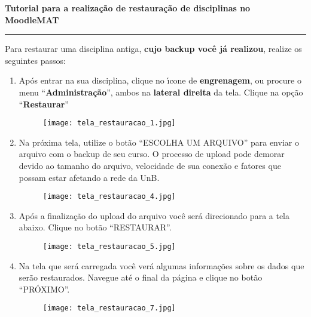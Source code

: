 \documentclass[12pt]{report}
\begin{document}
\newpage
\begin{center}
{\Large \textbf{Tutorial para a realiza\c{c}\~ao de restauração de disciplinas no MoodleMAT}}
\end{center}

\vspace{.3cm}

\hrule

\vspace{.7cm}
Para restaurar uma disciplina antiga, \textbf{cujo backup voc\^e j\'a realizou}, realize os seguintes passos:

\begin{enumerate}[\bf 1)]
	\item Ap\'os entrar na sua disciplina, clique no {\'\i}cone de \textbf{engrenagem}, ou procure o menu ``\textbf{Administra\c{c}\~ao}'', ambos na \textbf{lateral direita} da tela. Clique na opção ``\textbf{Restaurar}''
	\begin{figure}[H]
    	\centering
    	\hspace*{-2.5cm}\texttt{[image: tela\_restauracao\_1.jpg]}
  	\end{figure}

  	\newpage

	\item Na pr\'oxima tela, utilize o bot\~ao ``ESCOLHA UM ARQUIVO'' para enviar o arquivo com o backup de seu curso. O processo de upload pode demorar devido ao tamanho do arquivo, velocidade de sua conex\~ao e fatores que possam estar afetando a rede da UnB.
	\begin{figure}[H]
    	\centering
    	\hspace*{-2.5cm}\texttt{[image: tela\_restauracao\_4.jpg]}
  	\end{figure}

  	\newpage

	\item Ap\'os a finaliza\c{c}\~ao do upload do arquivo voc\^e ser\'a direcionado para a tela abaixo. Clique no bot\~ao ``RESTAURAR''.
	\begin{figure}[H]
    	\centering
    	\hspace*{-2.5cm}\texttt{[image: tela\_restauracao\_5.jpg]}
  	\end{figure}

	\newpage

	\item  Na tela que ser\'a carregada voc\^e ver\'a algumas informa\c{c}\~oes sobre os dados que ser\~ao restaurados. Navegue at\'e o final da p\'agina e clique no bot\~ao ``PR\'OXIMO''.
	\begin{figure}[H]
    	\centering
    	\hspace*{-2.5cm}\texttt{[image: tela\_restauracao\_7.jpg]}
  	\end{figure}


\end{enumerate}
\end{document}
